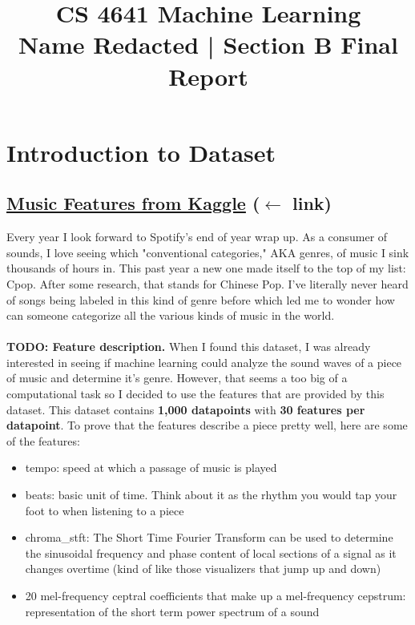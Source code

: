 \documentclass[12pt]{article}
\title{CS 4641 Machine Learning \\ Name Redacted | Section B Final Report}
\date{}
\author{}
\begin{document}
\maketitle

\section{Introduction to Dataset}
\subsection{\href{https://www.kaggle.com/insiyeah/musicfeatures}{Music Features from Kaggle} ($\leftarrow$ link)}
Every year I look forward to Spotify's end of year wrap up. As a consumer of sounds, I love seeing which "conventional categories," AKA genres, of music I sink thousands of hours in. This past year a new one made itself to the top of my list: Cpop. After some research, that stands for Chinese Pop. I've literally never heard of songs being labeled in this kind of genre before which led me to wonder how can someone categorize all the various kinds of music in the world. 
\\ \\
\textbf{TODO: Feature description.}
When I found this dataset, I was already interested in seeing if machine learning could analyze the sound waves of a piece of music and determine it's genre. However, that seems a too big of a computational task so I decided to use the features that are provided by this dataset. This dataset contains \textbf{1,000 datapoints} with \textbf{30 features per datapoint}. To prove that the features describe a piece pretty well, here are some of the features:
\begin{itemize}
    \item tempo: speed at which a passage of music is played
    \item beats: basic unit of time. Think about it as the rhythm you would tap your foot to when listening to a piece
    \item chroma\_stft: The Short Time Fourier Transform can be used to determine the sinusoidal frequency and phase content of local sections of a signal as it changes overtime (kind of like those visualizers that jump up and down)
    \item 20 mel-frequency ceptral coefficients that make up a mel-frequency cepstrum: representation of the short term power spectrum of a sound
\end{itemize}
\end{document}
